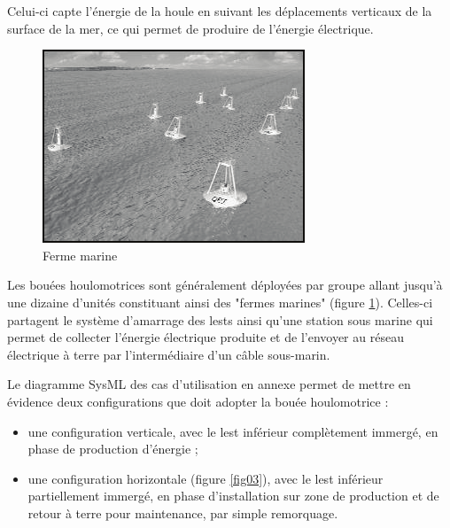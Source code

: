 Celui-ci capte l'énergie de la houle en suivant les déplacements verticaux de la surface de la mer, ce qui permet de produire de l'énergie électrique.

\begin{figure}
	\vspace{-0.8cm}
  \begin{center}
    \includegraphics[width=0.7\linewidth]{img/fig02}
  \end{center}
  \caption{Ferme marine}
\label{fig02}
\end{figure}

Les bouées houlomotrices sont généralement déployées par groupe allant jusqu'à une dizaine d'unités constituant ainsi des "fermes marines" (figure \ref{fig02}). Celles-ci partagent le système d'amarrage des lests ainsi qu'une station sous marine qui permet de collecter l'énergie électrique produite et de l'envoyer au réseau électrique à terre par l'intermédiaire d'un câble sous-marin.

\newpage

Le diagramme SysML des cas d'utilisation en annexe permet de mettre en évidence deux configurations que doit adopter la bouée houlomotrice :

\begin{itemize}
 \item une configuration verticale, avec le lest inférieur complètement immergé, en phase de production d'énergie ;
 \item une configuration horizontale (figure \ref{fig03}), avec le lest inférieur partiellement immergé, en phase d'installation sur zone de production et de retour à terre pour maintenance, par simple
remorquage.
\end{itemize}


